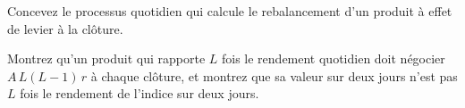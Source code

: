 \begin{interviewq}\label{iq:s2:the-volatility-index-complex:5}
Concevez le processus quotidien qui calcule le rebalancement d'un produit à effet de levier à la clôture.
\end{interviewq}

\begin{interviewq}\label{iq:s2:the-volatility-index-complex:6}
Montrez qu'un produit qui rapporte $L$ fois le rendement quotidien doit négocier $A\,L(L - 1)\,r$ à chaque clôture, et montrez que sa valeur sur deux jours n'est pas $L$
fois le rendement de l'indice sur deux jours.
\end{interviewq}
